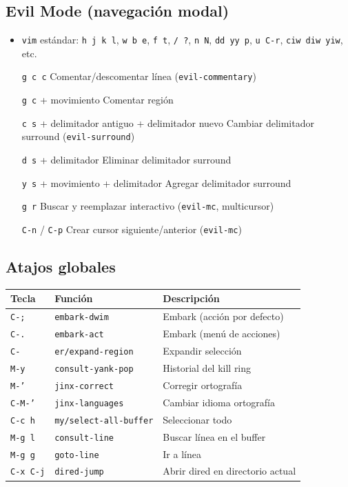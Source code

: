 \documentclass[11pt]{article}
\begin{document}
\subsection{Evil Mode (navegación modal)}
\label{sec:org5ad2356}
\begin{itemize}
\item \texttt{vim} estándar: \texttt{h j k l}, \texttt{w b e}, \texttt{f t}, \texttt{/ ?}, \texttt{n N}, \texttt{dd yy p}, \texttt{u C-r}, \texttt{ciw diw yiw}, etc.
\item[{\texttt{g c c}}] Comentar/descomentar línea (\texttt{evil-commentary})
\item[{\texttt{g c} + movimiento}] Comentar región
\item[{\texttt{c s} + delimitador antiguo + delimitador nuevo}] Cambiar delimitador surround (\texttt{evil-surround})
\item[{\texttt{d s} + delimitador}] Eliminar delimitador surround
\item[{\texttt{y s} + movimiento + delimitador}] Agregar delimitador surround
\item[{\texttt{g r}}] Buscar y reemplazar interactivo (\texttt{evil-mc}, multicursor)
\item[{\texttt{C-n} / \texttt{C-p}}] Crear cursor siguiente/anterior (\texttt{evil-mc})
\end{itemize}
\subsection{Atajos globales}
\label{sec:org201c10e}
\begin{center}
\begin{tabular}{lll}
Tecla & Función & Descripción\\
\hline
\texttt{C-;} & \texttt{embark-dwim} & Embark (acción por defecto)\\
\texttt{C-.} & \texttt{embark-act} & Embark (menú de acciones)\\
\texttt{C-} & \texttt{er/expand-region} & Expandir selección\\
\texttt{M-y} & \texttt{consult-yank-pop} & Historial del kill ring\\
\texttt{M-'} & \texttt{jinx-correct} & Corregir ortografía\\
\texttt{C-M-'} & \texttt{jinx-languages} & Cambiar idioma ortografía\\
\texttt{C-c h} & \texttt{my/select-all-buffer} & Seleccionar todo\\
\texttt{M-g l} & \texttt{consult-line} & Buscar línea en el buffer\\
\texttt{M-g g} & \texttt{goto-line} & Ir a línea\\
\texttt{C-x C-j} & \texttt{dired-jump} & Abrir dired en directorio actual\\
\end{tabular}
\end{center}
\end{document}
